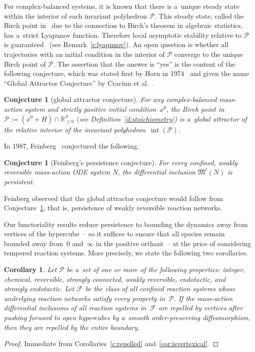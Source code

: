 \documentclass[pdftex]{sigma}
\newtheorem{Corollary}[Theorem]{Corollary}
\newtheorem{Conjecture}[Theorem]{Conjecture}
\begin{document}
For complex-balanced systems, it is known that there is a~unique steady state within the interior of each invariant
polyhedron  $\mathcal P$.
This steady state, called the Birch point in~\cite{TDS} due to the connection to Birch's theorem in algebraic
statistics, has a~strict Lyapunov function.
Therefore local asymptotic stability relative to $\mathcal P$ is guaranteed~\cite{Fein79, HornJackson} (see
Remark~\ref{r:lyapunov}).
An open question is whether all trajectories with an initial condition in the interior of $\mathcal P$ converge to the
unique Birch point of $\mathcal P$.
The assertion that the answer is ``yes'' is the content of the following conjecture, which was stated f\/irst by Horn
in 1974~\cite{horn74dynamics} and given the name ``Global Attractor Conjecture'' by Craciun et al.~\cite{TDS}.
\begin{Conjecture}[global attractor conjecture]
\label{c:GAC}
For any complex-balanced mass-action system and strictly positive initial condition~$x^0$, the Birch point in $\mathcal
P:=(x^0+H)\cap\mathbb{R}_{\ge0}^S$ $($see Definition~{\rm \ref{d:stoichiometry})} is a~global attractor of the relative interior of
the invariant polyhedron~$\operatorname{int}(\mathcal P)$.
\end{Conjecture}

In 1987, Feinberg~\cite{Fein87} conjectured the following.
\begin{Conjecture}[Feinberg's persistence conjecture]
\label{conj:persistence}
For every confined, weakly reversible mass-action ODE system $N$, the differential inclusion $\mathfrak M^\ell(N)$
is persistent.
\end{Conjecture}

Feinberg observed that the global attractor conjecture would follow from Conjecture~\ref{conj:persistence}, that is,
persistence of weakly reversible reaction networks.

Our functoriality results reduce persistence to bounding the dynamics away from vertices of the hypercube~-- so it
suf\/f\/ices to ensure that all species remain bounded away from~$0$ and~$\infty$ in the positive orthant~-- at the
price of considering tempered reaction systems.
More precisely, we state the following two corollaries.
\begin{Corollary}
\label{cor:repelled}
Let $\mathcal P$ be a~set of one or more of the following properties: integer, chemical, reversible, strongly
connected, weakly reversible, endotactic, and strongly endotactic.
Let $\mathcal F$ be the class of all confined reaction systems whose underlying reaction networks satisfy every
property in~$\mathcal P$.
If the mass-action differential inclusions of all reaction systems in~$\mathcal F$ are repelled by vertices after
pushing forward to open hypercubes by a~smooth order-preserving diffeomorphism, then they are repelled by the entire
boundary.
\end{Corollary}
\begin{proof}
Immediate from Corollaries~\ref{c:repelled} and~\ref{cor:isvertexical}.
\end{proof}
\end{document}
